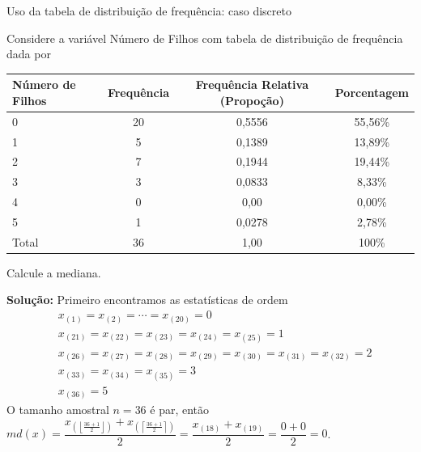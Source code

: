 \documentclass[8pt]{beamer}
\begin{document}
\begin{frame}{Uso da tabela de distribuição de frequência: caso discreto}

 {\scriptsize
Considere a variável Número de Filhos com tabela de distribuição de frequência dada por


 \begin{table}
  \centering
  \begin{tabular}{l|ccc}
    \toprule[0.05cm]
    Número de Filhos & Frequência & Frequência Relativa (Propoção) & Porcentagem\\
    \midrule[0.05cm]
    0 & 20 & 0,5556 & 55,56\% \\
    1 & 5 & 0,1389 & 13,89\% \\
    2 & 7 & 0,1944 & 19,44\% \\
    3 & 3 & 0,0833 & 8,33\% \\
    4 & 0 & 0,00 & 0,00\% \\
    5 & 1 & 0,0278 & 2,78\% \\ \midrule[0,05cm]
    Total & 36 & 1,00 & 100\% \\ \bottomrule[0,05cm]
  \end{tabular}
 \end{table}

 
 Calcule a mediana.
 
 
 \textbf{Solução:} Primeiro encontramos as estatísticas de ordem
 \begin{align*}
  &x_{(1)}=x_{(2)}=\cdots=x_{(20)} = 0\\
  &x_{(21)} = x_{(22)} = x_{(23)} = x_{(24)} = x_{(25)}=1\\
  &x_{(26)} = x_{(27)} =  x_{(28)} = x_{(29)} = x_{(30)} = x_{(31)} = x_{(32)} = 2\\
  &x_{(33)} = x_{(34)} = x_{(35)} = 3\\
  &x_{(36)} = 5
 \end{align*}
 O tamanho amostral $n=36$ é par, então $md(x) = \dfrac{ x_{\left( \left\lfloor \frac{36+1}{2} \right\rfloor \right)}+x_{\left( \left\lceil \frac{36+1}{2} \right\rceil \right)}}{2} = \dfrac{ x_{(18)}+x_{(19)}}{2} = \dfrac{0+0}{2}=0$.
}
\end{frame}
\end{document}
